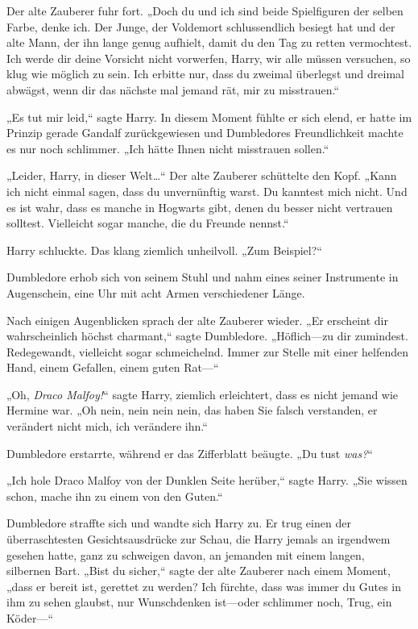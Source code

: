{Der alte Zauberer fuhr fort. „Doch du und ich sind beide Spielfiguren der selben Farbe, denke ich. Der Junge, der Voldemort schlussendlich besiegt hat und der alte Mann, der ihn lange genug aufhielt, damit du den Tag zu retten vermochtest. Ich werde dir deine Vorsicht nicht vorwerfen, Harry, wir alle müssen versuchen, so klug wie möglich zu sein. Ich erbitte nur, dass du zweimal überlegst und dreimal abwägst, wenn dir das nächste mal jemand rät, mir zu misstrauen.“

„Es tut mir leid,“ sagte Harry. In diesem Moment fühlte er sich elend, er hatte im Prinzip gerade Gandalf zurückgewiesen und Dumbledores Freundlichkeit machte es nur noch schlimmer. „Ich hätte Ihnen nicht misstrauen sollen.“

„Leider, Harry, in dieser Welt…“ Der alte Zauberer schüttelte den Kopf. „Kann ich nicht einmal sagen, dass du unvernünftig warst. Du kanntest mich nicht. Und es ist wahr, dass es manche in Hogwarts gibt, denen du besser nicht vertrauen solltest. Vielleicht sogar manche, die du Freunde nennst.“

Harry schluckte. Das klang ziemlich unheilvoll. „Zum Beispiel?“

Dumbledore erhob sich von seinem Stuhl und nahm eines seiner Instrumente in Augenschein, eine Uhr mit acht Armen verschiedener Länge.

Nach einigen Augenblicken sprach der alte Zauberer wieder. „Er erscheint dir wahrscheinlich höchst charmant,“ sagte Dumbledore. „Höflich—zu dir zumindest. Redegewandt, vielleicht sogar schmeichelnd. Immer zur Stelle mit einer helfenden Hand, einem Gefallen, einem guten Rat—“

„Oh, \emph{Draco Malfoy!}“ sagte Harry, ziemlich erleichtert, dass es nicht jemand wie Hermine war. „Oh nein, nein nein nein, das haben Sie falsch verstanden, er verändert nicht mich, ich verändere ihn.“

Dumbledore erstarrte, während er das Zifferblatt beäugte. „Du tust \emph{was?}“

„Ich hole Draco Malfoy von der Dunklen Seite herüber,“ sagte Harry. „Sie wissen schon, mache ihn zu einem von den Guten.“

Dumbledore straffte sich und wandte sich Harry zu. Er trug einen der überraschtesten Gesichtsausdrücke zur Schau, die Harry jemals an irgendwem gesehen hatte, ganz zu schweigen davon, an jemanden mit einem langen, silbernen Bart. „Bist du sicher,“ sagte der alte Zauberer nach einem Moment, „dass er bereit ist, gerettet zu werden? Ich fürchte, dass was immer du Gutes in ihm zu sehen glaubst, nur Wunschdenken ist—oder schlimmer noch, Trug, ein Köder—“

}

